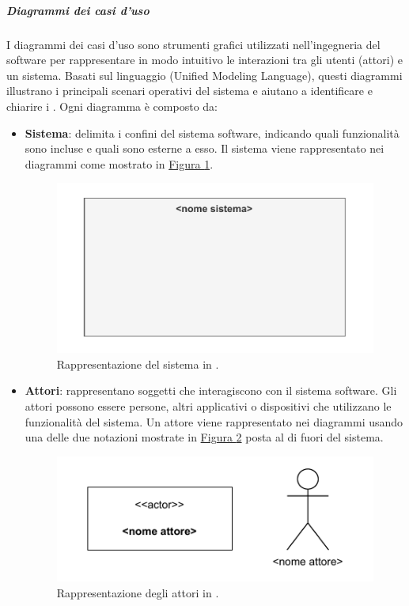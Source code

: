 \subparagraph{Diagrammi dei casi d'uso}
I diagrammi dei casi d'uso sono strumenti grafici utilizzati nell'ingegneria del software per rappresentare in modo intuitivo le interazioni tra gli utenti (attori) e un sistema. Basati sul linguaggio  (Unified Modeling Language), questi diagrammi illustrano i principali scenari operativi del sistema e aiutano a identificare e chiarire i .
Ogni diagramma è composto da:
\begin{itemize}
    \item \textbf{Sistema}: delimita i confini del sistema software, indicando quali funzionalità sono incluse e quali sono esterne a esso.
    Il sistema viene rappresentato nei diagrammi come mostrato in \hyperref[fig:sistema_uml]{Figura \ref{fig:sistema_uml}}.
    \begin{figure}[H]
        \centering
        \includegraphics{Sezioni/ProcessiPrimari/Immagini/sistema_caso_uso.pdf}
        \caption{Rappresentazione del sistema in .}
        \label{fig:sistema_uml}
    \end{figure}
    
    \item \textbf{Attori}: rappresentano soggetti che interagiscono con il sistema software. Gli attori possono essere persone, altri applicativi o dispositivi che utilizzano le funzionalità del sistema.
    Un attore viene rappresentato nei diagrammi usando una delle due notazioni mostrate in \hyperref[fig:attori_uml]{Figura \ref{fig:attori_uml}} posta al di fuori del sistema.
    \begin{figure}[H]
        \centering
        \includegraphics{Sezioni/ProcessiPrimari/Immagini/attori_caso_uso.pdf}
        \caption{Rappresentazione degli attori in .}
        \label{fig:attori_uml}
    \end{figure}
    

\end{itemize}
